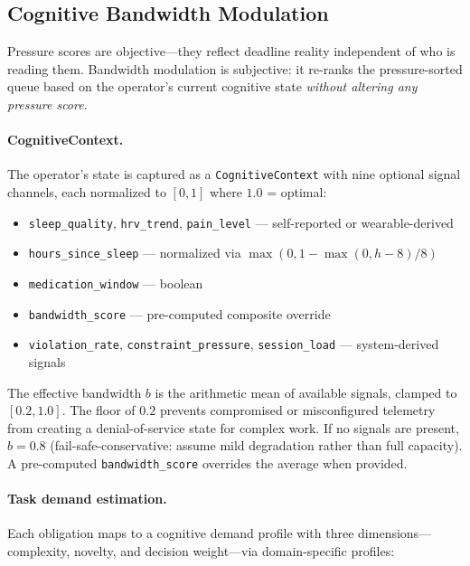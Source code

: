 \documentclass[11pt]{article}
\begin{document}
\subsection{Cognitive Bandwidth Modulation}
\label{sec:bandwidth}

Pressure scores are objective---they reflect deadline reality
independent of who is reading them.
Bandwidth modulation is subjective: it re-ranks the pressure-sorted
queue based on the operator's current cognitive state \emph{without
altering any pressure score}.

\paragraph{CognitiveContext.}
The operator's state is captured as a \texttt{CognitiveContext}
with nine optional signal channels, each normalized to $[0, 1]$
where $1.0$ = optimal:
\begin{itemize}[nosep]
  \item \texttt{sleep\_quality}, \texttt{hrv\_trend},
        \texttt{pain\_level} --- self-reported or wearable-derived
  \item \texttt{hours\_since\_sleep} --- normalized via
        $\max(0, 1 - \max(0, h - 8) / 8)$
  \item \texttt{medication\_window} --- boolean
  \item \texttt{bandwidth\_score} --- pre-computed composite override
  \item \texttt{violation\_rate}, \texttt{constraint\_pressure},
        \texttt{session\_load} --- system-derived signals
\end{itemize}
The effective bandwidth $b$ is the arithmetic mean of available
signals, clamped to $[0.2, 1.0]$.  The floor of $0.2$ prevents
compromised or misconfigured telemetry from creating a denial-of-service
state for complex work.  If no signals are present, $b = 0.8$
(fail-safe-conservative: assume mild degradation rather than full
capacity).  A pre-computed \texttt{bandwidth\_score} overrides
the average when provided.

\paragraph{Task demand estimation.}
Each obligation maps to a cognitive demand profile with three
dimensions---complexity, novelty, and decision weight---via
domain-specific profiles:
\end{document}
